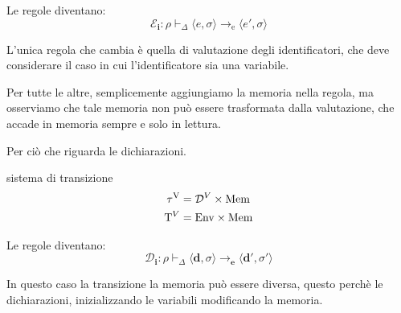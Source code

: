 Le regole diventano:
\[
    \mathcal{E}_\mathbf{i} : \rho \vdash_\Delta \langle e, \sigma \rangle \to_\mathrm{e} \langle e', \sigma \rangle
\]

L'unica regola che cambia è quella di valutazione degli identificatori, che deve considerare il caso in cui l'identificatore sia una variabile.


Per tutte le altre, semplicemente aggiungiamo la memoria nella regola, ma osserviamo che tale memoria non può essere trasformata dalla valutazione, che accade in memoria sempre e solo in lettura.

\medskip
Per ciò che riguarda le dichiarazioni.

\begin{mydef}{sistema di transizione}
    \[
        \begin{aligned}
            \tau^\mathrm{V} &= \mathcal{D}^\mathnormal{V} \times \mathrm{Mem}\\
            \mathrm{T}^\mathnormal{V} &= \mathrm{Env} \times \mathrm{Mem}
        \end{aligned}
    \]
\end{mydef}

Le regole diventano:
\[
    \mathcal{D}_\mathbf{i} : \rho \vdash_\Delta \langle \mathbf{d}, \sigma \rangle \to_\mathbf{e} \langle \mathbf{d'}, \sigma' \rangle
\]

In questo caso la transizione la memoria può essere diversa, questo perchè le dichiarazioni, inizializzando le variabili modificando la memoria.


